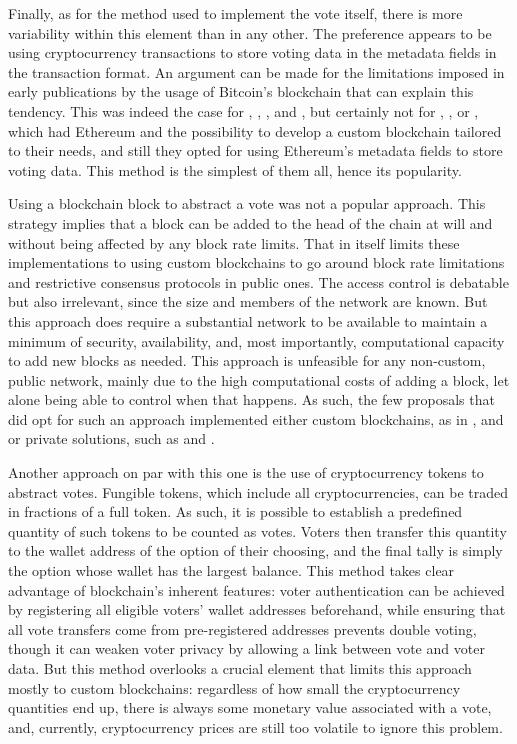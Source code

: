 \documentclass[../access.tex]{subfiles}
\begin{document}
	\par
    Finally, as for the method used to implement the vote itself, there is more variability within this element than in any other. The preference appears to be using cryptocurrency transactions to store voting data in the metadata fields in the transaction format. An argument can be made for the limitations imposed in early publications by the usage of Bitcoin's blockchain that can explain this tendency. This was indeed the case for \cite{Zhao2016}, \cite{Cruz2016}, \cite{Bistarelli2017}, \cite{Lee2017} and \cite{Bartolucci2018}, but certainly not for \cite{Hardwick2018}, \cite{Wang2018}, \cite{Lai2018} or \cite{Bosri2019}, which had Ethereum and the possibility to develop a custom blockchain tailored to their needs, and still they opted for using Ethereum's metadata fields to store voting data. This method is the simplest of them all, hence its popularity.
	\par
	Using a blockchain block to abstract a vote was not a popular approach. This strategy implies that a block can be added to the head of the chain at will and without being affected by any block rate limits. That in itself limits these implementations to using custom blockchains to go around block rate limitations and restrictive consensus protocols in public ones. The access control is debatable but also irrelevant, since the size and members of the network are known. But this approach does require a substantial network to be available to maintain a minimum of security, availability, and, most importantly, computational capacity to add new blocks as needed. This approach is unfeasible for any non-custom, public network, mainly due to the high computational costs of adding a block, let alone being able to control when that happens. As such, the few proposals that did opt for such an approach implemented either custom blockchains, as in \cite{BenAyed2017}, \cite{Khan2018} and \cite{Yi2019} or private solutions, such as \cite{Singh2019} and \cite{Adiputra2019}.
	\par
    Another approach on par with this one is the use of cryptocurrency tokens to abstract votes. Fungible tokens, which include all cryptocurrencies, can be traded in fractions of a full token. As such, it is possible to establish a predefined quantity of such tokens to be counted as votes. Voters then transfer this quantity to the wallet address of the option of their choosing, and the final tally is simply the option whose wallet has the largest balance. This method takes clear advantage of blockchain's inherent features: voter authentication can be achieved by registering all eligible voters' wallet addresses beforehand, while ensuring that all vote transfers come from pre-registered addresses prevents double voting, though it can weaken voter privacy by allowing a link between vote and voter data. But this method overlooks a crucial element that limits this approach mostly to custom blockchains: regardless of how small the cryptocurrency quantities end up, there is always some monetary value associated with a vote, and, currently, cryptocurrency prices are still too volatile to ignore this problem.
\end{document}
